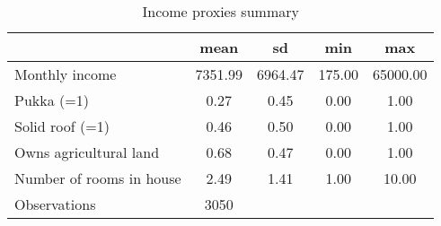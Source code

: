 \begin{table}[htbp]\centering
\def\sym#1{\ifmmode^{#1}\else\(^{#1}\)\fi}
\caption{Income proxies summary}
\begin{tabular}{l*{1}{cccc}}
\toprule
                    &        mean&          sd&         min&         max\\
\midrule
Monthly income      &     7351.99&     6964.47&      175.00&    65000.00\\
Pukka (=1)          &        0.27&        0.45&        0.00&        1.00\\
Solid roof (=1)     &        0.46&        0.50&        0.00&        1.00\\
Owns agricultural land&        0.68&        0.47&        0.00&        1.00\\
Number of rooms in house&        2.49&        1.41&        1.00&       10.00\\
\midrule
Observations        &        3050&            &            &            \\
\bottomrule
\end{tabular}
\end{table}
